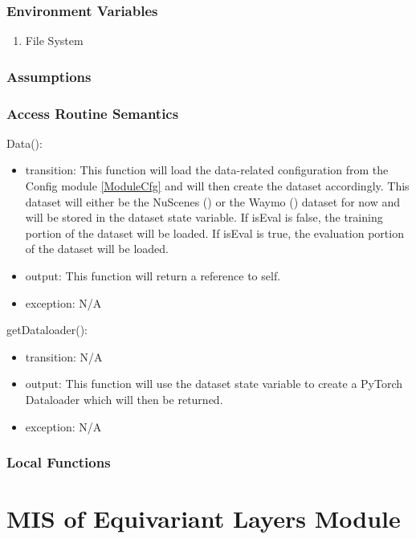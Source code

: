 \documentclass[12pt, titlepage]{article}
\begin{document}
\subsubsection{Environment Variables}
\begin{enumerate}
  \item File System
\end{enumerate}

\subsubsection{Assumptions}



\subsubsection{Access Routine Semantics}
\noindent Data():
\begin{itemize}
\item transition: This function will load the data-related configuration from the Config module \ref{ModuleCfg} and will then create the dataset accordingly.
This dataset will either be the NuScenes (\cite{caesar2020nuscenes}) or the Waymo (\cite{sun2020scalability}) dataset for now and will be stored in the dataset state variable. If isEval is false,
the training portion of the dataset will be loaded. If isEval is true, the evaluation portion of the dataset will be loaded.
\item output: This function will return a reference to self. 
\item exception: N/A
\end{itemize}

\noindent getDataloader():
\begin{itemize}
  \item transition: N/A
  \item output: This function will use the dataset state variable to create a PyTorch Dataloader which will then be returned.
  \item exception: N/A
\end{itemize}

\subsubsection{Local Functions}

\newpage

\section{MIS of Equivariant Layers Module} \label{ModuleEQ} 
\end{document}
